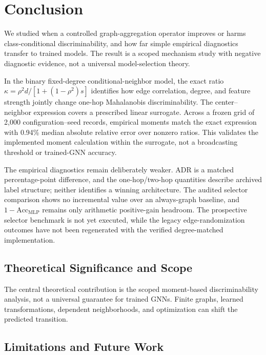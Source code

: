 
\section{Conclusion}
\label{sec:conclusion}

We studied when a controlled graph-aggregation operator improves or harms class-conditional discriminability, and how far simple empirical diagnostics transfer to trained models. The result is a scoped mechanism study with negative diagnostic evidence, not a universal model-selection theory.

In the binary fixed-degree conditional-neighbor model, the exact ratio $\kappa=\rho^2d/[1+(1-\rho^2)s]$ identifies how edge correlation, degree, and feature strength jointly change one-hop Mahalanobis discriminability. The center--neighbor expression covers a prescribed linear surrogate. Across a frozen grid of 2,000 configuration--seed records, empirical moments match the exact expression with 0.94\% median absolute relative error over nonzero ratios. This validates the implemented moment calculation within the surrogate, not a broadcasting threshold or trained-GNN accuracy.

The empirical diagnostics remain deliberately weaker. ADR is a matched percentage-point difference, and the one-hop/two-hop quantities describe archived label structure; neither identifies a winning architecture. The audited selector comparison shows no incremental value over an always-graph baseline, and $1-\mathrm{Acc}_{\mathrm{MLP}}$ remains only arithmetic positive-gain headroom. The prospective selector benchmark is not yet executed, while the legacy edge-randomization outcomes have not been regenerated with the verified degree-matched implementation.

\subsection{Theoretical Significance and Scope}

The central theoretical contribution is the scoped moment-based discriminability analysis, not a universal guarantee for trained GNNs. Finite graphs, learned transformations, dependent neighborhoods, and optimization can shift the predicted transition.

\subsection{Limitations and Future Work}

